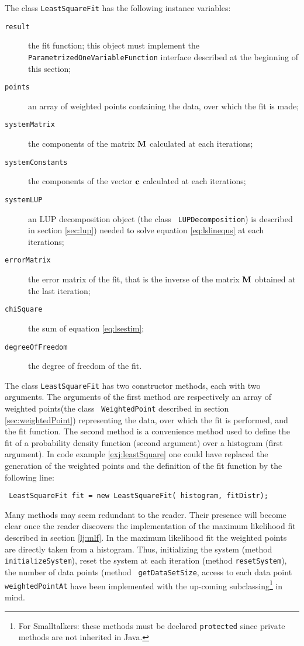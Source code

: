 \documentclass[twoside]{book}
\begin{document}
\noindent The class {\tt LeastSquareFit} has the following
instance variables:
\begin{description}
  \item[\tt result] the fit function; this object must implement
  the {\tt ParametrizedOneVariableFunction} interface described at the beginning of this section;
  \item[\tt points] an array of weighted points
  containing the data, over which the fit is made;
  \item[\tt systemMatrix] the components of the matrix ${\bf M}$ calculated at each
  iterations;
  \item[\tt systemConstants] the components of the vector ${\bf c}$ calculated at each
  iterations;
  \item[\tt systemLUP] an LUP decomposition object (the class {\tt
  LUPDecomposition}) is described in section \ref{sec:lup}) needed to solve
  equation \ref{eq:lslinequs} at each iterations;
  \item[\tt errorMatrix] the error matrix of the fit, that is the
  inverse of the matrix ${\bf M}$ obtained at the last iteration;
  \item[\tt chiSquare] the sum of equation \ref{eq:lsestim};
  \item[\tt degreeOfFreedom] the degree of freedom of the fit.
\end{description}
The class {\tt LeastSquareFit} has two constructor methods, each
with two arguments. The arguments of the first method are
respectively an array of weighted points(the class {\tt
WeightedPoint} described in section \ref{sec:weightedPoint})
representing the data, over which the fit is performed, and the
fit function. The second method is a convenience method used to
define the fit of a probability density function (second argument)
over a histogram (first argument). In code example
\ref{exj:leastSquare} one could have replaced the generation of
the weighted points and the definition of  the fit function by the
following line:
\begin{verbatim}
 LeastSquareFit fit = new LeastSquareFit( histogram, fitDistr);
\end{verbatim}
Many methods may seem redundant to the reader. Their presence will
become clear once the reader discovers the implementation of the
maximum likelihood fit described in section \ref{lj:mlf}. In the
maximum likelihood fit the weighted points are directly taken from
a histogram. Thus, initializing the system (method {\tt
initializeSystem}), reset the system at each iteration (method
{\tt resetSystem}), the number of data points (method {\tt
getDataSetSize}, access to each data point {\tt weightedPointAt}
have been implemented with the up-coming subclassing\footnote{For
Smalltalkers: these methods must be declared {\tt protected} since
private methods are not inherited in Java.} in mind.
\end{document}
